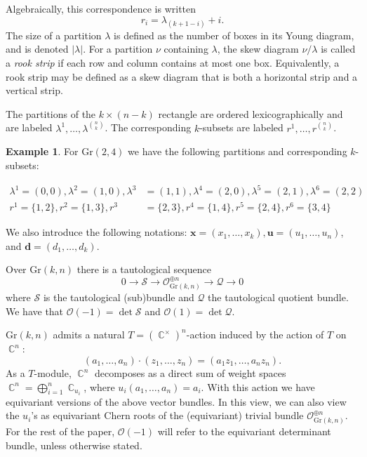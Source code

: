 \documentclass[12pt]{article}
\DeclareMathOperator{\C}{\mathbb{C}}
\newcommand{\OC}{\mathcal{O}}
\theoremstyle{plain}
\theoremstyle{definition}
\newtheorem{example}[theorem]{Example}
\newcommand{\xb}{\boldsymbol{x}}
\newcommand{\ub}{\boldsymbol{u}}
\begin{document}
 
Algebraically, this correspondence is written
\begin{equation}\label{orderings}
r_i = \lambda_{(k+1-i)} +i.\end{equation}
The size of a partition $\lambda$ is defined as the number of boxes in its Young diagram, and is denoted $|\lambda |$. For a partition $\nu$ containing $\lambda$, the skew diagram $\nu/\lambda$ is called a \emph{rook strip} if each row and column contains at most one box. Equivalently, a rook strip may be defined as a skew diagram that is both a horizontal strip and a vertical strip. 
\vspace{.5cm}

The partitions of the $k \times (n-k)$ rectangle are ordered lexicographically and are labeled $\lambda^1, \dots, \lambda^{\binom{n}{k}}$. The corresponding $k$-subsets are labeled $r^1,\dots, r^{\binom{n}{k}}$.   


\begin{example}
For $\textrm{Gr}(2,4)$ we have the following partitions and corresponding $k$-subsets:

\begin{align*}
    \lambda^1 = (0,0), \lambda^2 = (1,0), \lambda^3 &= (1,1), \lambda^4 =(2,0), \lambda^5 = (2,1), \lambda^6 = (2,2)\\
    r^1 = \{1,2\},r^2 = \{1,3\},r^3 &= \{2,3\},r^4 = \{1,4\},r^5 = \{2,4\},r^6 = \{3,4\}
\end{align*}
\end{example}
We also introduce the following notations: $\xb=(x_1,\dots,x_k),\ub=(u_1,\dots, u_n)$, and $\boldsymbol{d}=(d_1,\dots,d_k)$.




Over $\textrm{Gr}(k,n)$ there is a tautological sequence 
$$
0 \to \mathcal S \to \mathcal O_{\textrm{Gr}(k,n)}^{\oplus n} \to \mathcal Q \to 0
$$
where $\mathcal S$ is the tautological (sub)bundle and $\mathcal Q$ the tautological quotient bundle. We have that $\mathcal O (-1) = \det \mathcal S$ and $\mathcal O(1) = \det \mathcal Q$.


$\textrm{Gr}(k,n)$ admits a natural $T=(\C^\times)^n$-action induced by the action of $T$ on $\C^n$:
$$
(a_1, \ldots, a_n) \cdot (z_1, \ldots, z_n) = (a_1 z_1, \dots, a_n z_n).
$$
As a $T$-module, $\C^n$ decomposes as a direct sum of weight spaces $\C^n = \bigoplus_{i=1}^n \C_{u_i}$, where $u_i (a_1, \ldots, a_n) = a_i$. With this action we have equivariant versions of the above vector bundles. In this view, we can also view the $u_i$'s as equivariant Chern roots of the (equivariant) trivial bundle $\OC_{\mathrm{Gr}(k,n)}^{\oplus n}$. For the rest of the paper, $\OC(-1)$ will refer to the equivariant determinant bundle, unless otherwise stated.
\end{document}
